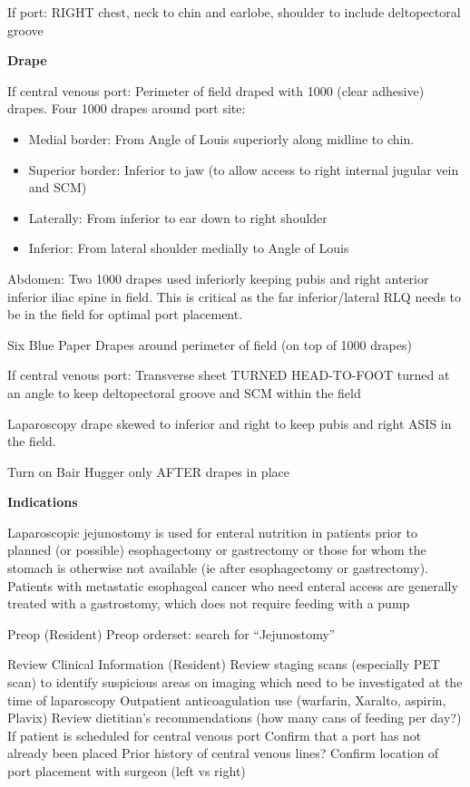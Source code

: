 \documentclass[
]{book}
\providecommand{\tightlist}{%
  \setlength{\itemsep}{0pt}\setlength{\parskip}{0pt}}
\begin{document}
If port: RIGHT chest, neck to chin and earlobe, shoulder to include deltopectoral groove

\textbf{Drape}

If central venous port: Perimeter of field draped with 1000 (clear adhesive) drapes. Four 1000 drapes around port site:

\begin{itemize}
\tightlist
\item
  Medial border: From Angle of Louis superiorly along midline to chin.
\item
  Superior border: Inferior to jaw (to allow access to right internal jugular vein and SCM)
\item
  Laterally: From inferior to ear down to right shoulder
\item
  Inferior: From lateral shoulder medially to Angle of Louis
\end{itemize}

Abdomen: Two 1000 drapes used inferiorly keeping pubis and right anterior inferior iliac spine in field. This is critical as the far inferior/lateral RLQ needs to be in the field for optimal port placement.

Six Blue Paper Drapes around perimeter of field (on top of 1000 drapes)

If central venous port: Transverse sheet TURNED HEAD-TO-FOOT turned at an angle to keep deltopectoral groove and SCM within the field

Laparoscopy drape skewed to inferior and right to keep pubis and right ASIS in the field.

Turn on Bair Hugger only AFTER drapes in place

\textbf{Indications}

Laparoscopic jejunostomy is used for enteral nutrition in patients prior to planned (or possible) esophagectomy or gastrectomy or those for whom the stomach is otherwise not available (ie after esophagectomy or gastrectomy). Patients with metastatic esophageal cancer who need enteral access are generally treated with a gastrostomy, which does not require feeding with a pump

Preop (Resident)
Preop orderset: search for ``Jejunostomy''

Review Clinical Information (Resident)
Review staging scans (especially PET scan) to identify suspicious areas on imaging which need to be investigated at the time of laparoscopy
Outpatient anticoagulation use (warfarin, Xaralto, aspirin, Plavix)
Review dietitian's recommendations (how many cans of feeding per day?)
If patient is scheduled for central venous port
Confirm that a port has not already been placed
Prior history of central venous lines?
Confirm location of port placement with surgeon (left vs right)
\end{document}
